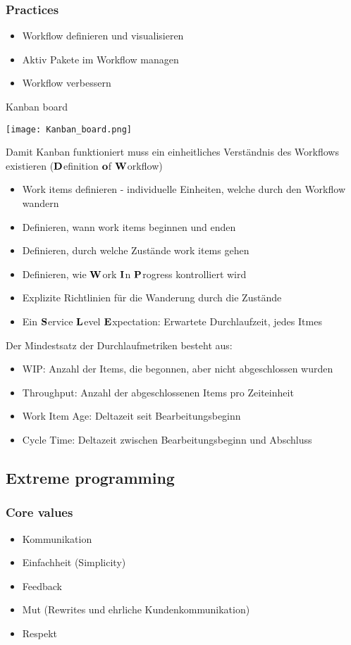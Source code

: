 \subsubsection{Practices}
\begin{itemize}
	\item Workflow definieren und visualisieren
	\item Aktiv Pakete im Workflow managen
	\item Workflow verbessern
\end{itemize}
\begin{table}[H]
\caption{Kanban board}
\texttt{[image: Kanban\_board.png]}
\end{table}
Damit Kanban funktioniert muss ein einheitliches Verständnis des Workflows existieren ($\bold D$efinition $\bold o$f $\bold W$orkflow)
\begin{itemize}
	\item \glqq{}Work items\grqq{} definieren - individuelle Einheiten, welche durch den Workflow wandern
	\item Definieren, wann \glqq{}work items\grqq{} beginnen und enden
	\item Definieren, durch welche Zustände \glqq{}work items\grqq{} gehen
	\item Definieren, wie \glqq{}$\bold W$ork $\bold I$n $\bold P$rogress\grqq{} kontrolliert wird
	\item Explizite Richtlinien für die \glqq{}Wanderung\grqq{} durch die Zustände
	\item Ein \glqq{}$\bold S$ervice $\bold L$evel $\bold E$xpectation\grqq{}: Erwartete Durchlaufzeit, jedes Itmes
\end{itemize}
Der Mindestsatz der Durchlaufmetriken besteht aus:
\begin{itemize}
	\item WIP: Anzahl der Items, die begonnen, aber nicht abgeschlossen wurden
	\item Throughput: Anzahl der abgeschlossenen Items pro Zeiteinheit
	\item Work Item Age: Deltazeit seit Bearbeitungsbeginn
	\item Cycle Time: Deltazeit zwischen Bearbeitungsbeginn und Abschluss
\end{itemize}
\subsection{Extreme programming}
\subsubsection{Core values}
\begin{itemize}
	\item Kommunikation
	\item Einfachheit (Simplicity)
	\item Feedback
	\item Mut (Rewrites und ehrliche Kundenkommunikation)
	\item Respekt
\end{itemize}
